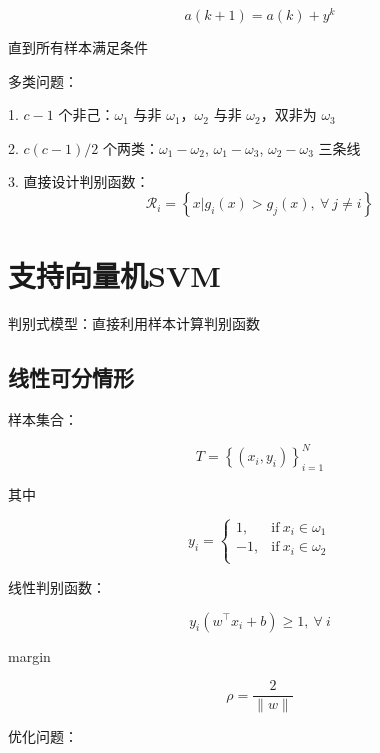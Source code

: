 \documentclass[openany,a4paper,12pt]{ctexbook}
\theoremstyle{kaiti}
\theoremstyle{normal}
\begin{document}
\begin{equation}
a\left(k+1 \right)=a\left(k \right)+y^k
\end{equation}

直到所有样本满足条件

多类问题：

1. $c-1$ 个非己：$\omega_1$ 与非 $\omega_1$，$\omega_2$ 与非 $\omega_2$，双非为 $\omega_3$

2. $c\left(c-1 \right)/2$ 个两类：$\omega_1-\omega_2$, $\omega_1-\omega_3$, $\omega_2-\omega_3$ 三条线

3. 直接设计判别函数：
\begin{equation}
  \mathcal{R}_i=\left\{ x|g_i(x)>g_j(x),~\forall~j\ne i \right\}
\end{equation}

\chapter{支持向量机SVM}

判别式模型：直接利用样本计算判别函数

\section{线性可分情形}

样本集合：

\begin{equation}
  T=\left\{ \left(x_i,y_i \right)\right\}_{i=1}^{N}
\end{equation}

其中

\begin{equation}
  y_i=
  \begin{cases}
    1, &\mathrm{if}~x_i\in \omega_1\\
    -1, &\mathrm{if}~x_i\in \omega_2\\
  \end{cases}
\end{equation}

线性判别函数：

\begin{equation}
  y_i\left(w^{\top}x_i+b \right)\geqslant 1,~\forall~i
\end{equation}

margin 

\begin{equation}
  \rho=\frac{2}{\|w\|}
\end{equation}

优化问题：
\end{document}
